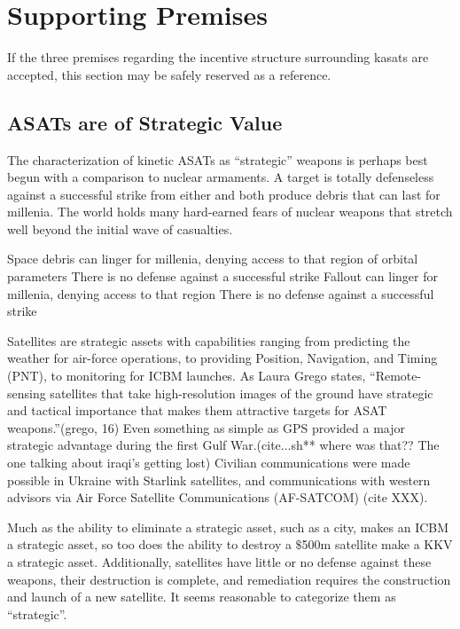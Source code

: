 \section{Supporting Premises}
\label{section::support}

If the three premises regarding the incentive structure surrounding
\acp{kasat} are accepted, this section may be safely reserved as a
reference.

\subsection{ASATs are of Strategic Value}

The characterization of kinetic ASATs as ``strategic'' weapons is
perhaps best begun with a comparison to nuclear armaments.  A target
is totally defenseless against a successful strike from either and
both produce debris that can last for millenia.  The world holds many
hard-earned fears of nuclear weapons that stretch well beyond the
initial wave of casualties.


Space debris can linger for millenia, denying access to that region of
orbital parameters There is no defense against a successful strike
Fallout can linger for millenia, denying access to that region There
is no defense against a successful strike

Satellites are strategic assets with capabilities ranging from
predicting the weather for air-force operations, to providing
Position, Navigation, and Timing (PNT), to monitoring for ICBM
launches.  As Laura Grego states, ``Remote-sensing satellites that
take high-resolution images of the ground have strategic and tactical
importance that makes them attractive targets for ASAT
weapons.''(grego, 16) Even something as simple as GPS provided a major
strategic advantage during the first Gulf War.(cite...sh** where was
that?? The one talking about iraqi's getting lost) Civilian
communications were made possible in Ukraine with Starlink satellites,
and communications with western advisors via Air Force Satellite
Communications (AF-SATCOM) (cite XXX).

Much as the ability to eliminate a strategic asset, such as a city,
makes an ICBM a strategic asset, so too does the ability to destroy a
$\$$500m satellite make a KKV a strategic asset.  Additionally,
satellites have little or no defense against these weapons, their
destruction is complete, and remediation requires the construction and
launch of a new satellite.  It seems reasonable to categorize them as
``strategic''.

